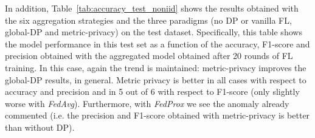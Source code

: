 \documentclass[5p,times]{elsarticle}
\begin{document}
\begin{table*}[t]
    \centering
    \caption{Accuracy, F1-score and precision obtained in the test set with each approach. Non-i.i.d clients.}
    \label{tab:accuracy_test_noniid}
\end{table*}

In addition, Table~\ref{tab:accuracy_test_noniid} shows the results obtained with the six aggregation strategies and the three paradigms (no DP or vanilla FL, global-DP and metric-privacy) on the test dataset. Specifically, this table shows the model performance in this test set as a function of the accuracy, F1-score and precision obtained with the aggregated model obtained after 20 rounds of FL training. In this case, again the trend is maintained: metric-privacy improves the global-DP results, in general. Metric privacy is better in all cases with respect to accuracy and precision and in 5 out of 6 with respect to F1-score (only slightly worse with \textit{FedAvg}). Furthermore, with \textit{FedProx} we see the anomaly already commented (i.e. the precision and F1-score obtained with metric-privacy is better than without DP). 
\end{document}

